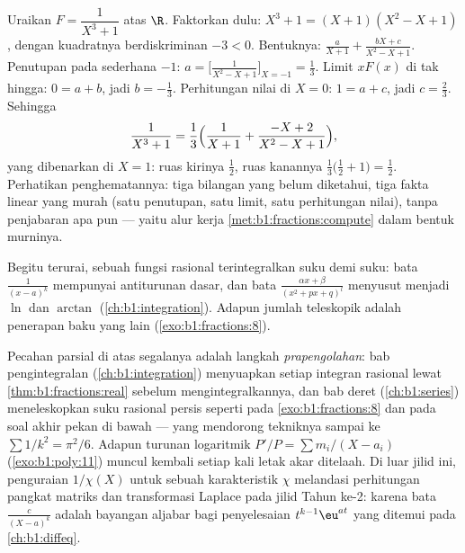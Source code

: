 \begin{example}\label{ex:b1:fractions:cubic}
Uraikan $F = \dfrac{1}{X^3 + 1}$ atas $\R$. Faktorkan dulu: $X^3 +
1 = (X + 1)(X^2 - X + 1)$, dengan kuadratnya berdiskriminan $-3 <
0$. Bentuknya: $\frac{a}{X+1} + \frac{bX + c}{X^2 - X + 1}$. Penutupan
pada  sederhana $-1$: $a = \bigl[\frac1{X^2 - X +
1}\bigr]_{X=-1} = \frac13$. Limit $xF(x)$ di tak hingga: $0 = a +
b$, jadi $b = -\frac13$. Perhitungan nilai di $X = 0$: $1 = a + c$, jadi $c =
\frac23$. Sehingga
\[
\frac{1}{X^3+1} = \frac13\Bigl(\frac{1}{X+1}
+ \frac{-X + 2}{X^2 - X + 1}\Bigr) ,
\]
yang dibenarkan di $X = 1$: ruas kirinya $\frac12$, ruas kanannya
$\frac13\bigl(\frac12 + 1\bigr) = \frac12$. Perhatikan penghematannya:
tiga bilangan yang belum diketahui, tiga fakta linear yang murah (satu penutupan, satu
limit, satu perhitungan nilai), tanpa penjabaran apa pun --- yaitu alur kerja
\cref{met:b1:fractions:compute} dalam bentuk murninya.
\end{example}

\begin{remark}
Begitu terurai, sebuah fungsi rasional terintegralkan suku demi suku: bata
$\frac{1}{(x-a)^k}$ mempunyai antiturunan dasar, dan bata
$\frac{\alpha x + \beta}{(x^2 + px + q)^l}$ menyusut menjadi $\ln$ dan
$\arctan$ (\cref{ch:b1:integration}). Adapun jumlah teleskopik adalah penerapan
baku yang lain (\cref{exo:b1:fractions:8}).
\end{remark}

\begin{remark}\label{rem:b1:fractions:whereused}
Pecahan parsial di atas segalanya adalah langkah \emph{prapengolahan}: bab
pengintegralan (\cref{ch:b1:integration}) menyuapkan setiap integran rasional
lewat \cref{thm:b1:fractions:real} sebelum mengintegralkannya,
dan bab deret (\cref{ch:b1:series}) meneleskopkan suku rasional
persis seperti pada \cref{exo:b1:fractions:8} dan pada soal akhir
pekan di bawah --- yang mendorong tekniknya sampai ke
$\sum 1/k^2 = \pi^2/6$. Adapun turunan logaritmik $P'/P = \sum
m_i/(X - a_i)$ (\cref{exo:b1:poly:11}) muncul kembali setiap kali letak
akar ditelaah. Di luar jilid ini, penguraian
$1/\chi(X)$ untuk sebuah  karakteristik $\chi$ melandasi
perhitungan pangkat matriks dan transformasi Laplace pada jilid Tahun
ke-2: karena bata $\frac{c}{(X - a)^k}$ adalah bayangan aljabar
bagi penyelesaian $t^{k-1}\eu^{at}$ yang ditemui pada \cref{ch:b1:diffeq}.
\end{remark}

